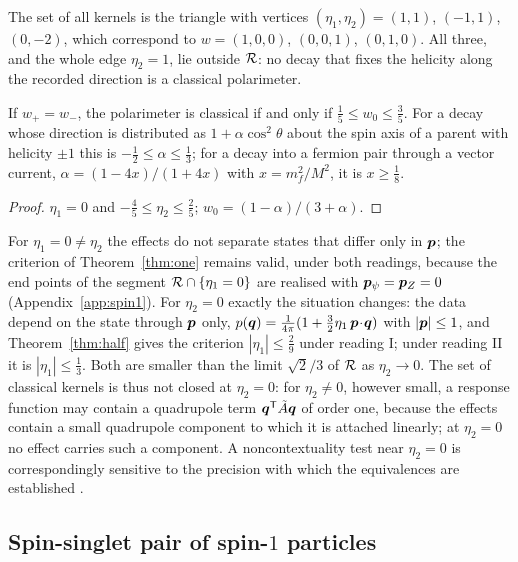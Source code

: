 The set of all kernels is the triangle with vertices $(\eta_1,\eta_2)=(1,1)$, $(-1,1)$, $(0,-2)$, which correspond to $w=(1,0,0)$, $(0,0,1)$, $(0,1,0)$. All three, and the whole edge $\eta_2=1$, lie outside $\mathcal{R}$: no decay that fixes the helicity along the recorded direction is a classical polarimeter.

\begin{corollary}
\label{cor:parity}
If $w_+=w_-$, the polarimeter is classical if and only if $\tfrac15\le w_0\le\tfrac35$. For a decay whose direction is distributed as $1+\alpha\cos^2\theta$ about the spin axis of a parent with helicity $\pm1$ this is $-\tfrac12\le\alpha\le\tfrac13$; for a decay into a fermion pair through a vector current, $\alpha=(1-4x)/(1+4x)$ with $x=m_f^2/M^2$, it is $x\ge\tfrac18$.
\end{corollary}

\begin{proof}
$\eta_1=0$ and $-\tfrac45\le\eta_2\le\tfrac25$; $w_0=(1-\alpha)/(3+\alpha)$.
\end{proof}

\begin{remark}
\label{rem:deg}
For $\eta_1=0\ne\eta_2$ the effects do not separate states that differ only in $\bm{p}$; the criterion of Theorem~\ref{thm:one} remains valid, under both readings, because the end points of the segment $\mathcal{R}\cap\{\eta_1=0\}$ are realised with $\bm{p}_\psi=\bm{p}_Z=0$ (Appendix~\ref{app:spin1}). For $\eta_2=0$ exactly the situation changes: the data depend on the state through $\bm{p}$ only, $p(\bm{q})=\frac{1}{4\pi}(1+\tfrac32\eta_1\,\bm{p}\!\cdot\!\bm{q})$ with $|\bm{p}|\le1$, and Theorem~\ref{thm:half} gives the criterion $|\eta_1|\le\tfrac29$ under reading I; under reading II it is $|\eta_1|\le\tfrac13$. Both are smaller than the limit $\sqrt2/3$ of $\mathcal{R}$ as $\eta_2\to0$. The set of classical kernels is thus not closed at $\eta_2=0$: for $\eta_2\ne0$, however small, a response function may contain a quadrupole term $\bm{q}^{\mathsf{T}}\tilde A\bm{q}$ of order one, because the effects contain a small quadrupole component to which it is attached linearly; at $\eta_2=0$ no effect carries such a component. A noncontextuality test near $\eta_2=0$ is correspondingly sensitive to the precision with which the equivalences are established \cite{mazurek2016,pusey2018}.
\end{remark}

\subsection{Spin-singlet pair of spin-$1$ particles}

